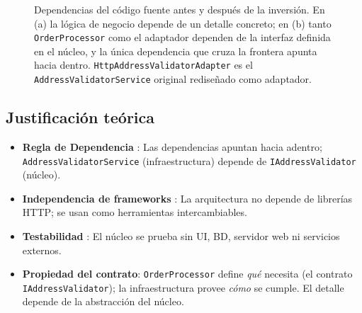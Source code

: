 \begin{figure}[H]
    \caption{Dependencias del código fuente antes y después de la inversión. En (a) la lógica de negocio depende de un detalle concreto; en (b) tanto \texttt{OrderProcessor} como el adaptador dependen de la interfaz definida en el núcleo, y la única dependencia que cruza la frontera apunta hacia dentro. \texttt{HttpAddressValidatorAdapter} es el \texttt{AddressValidatorService} original rediseñado como adaptador.}
    \label{fig:dip-before-after}
\end{figure}

\subsection*{Justificación teórica}

\begin{itemize}
    \item \textbf{Regla de Dependencia} : Las dependencias apuntan hacia adentro; \texttt{AddressValidatorService} (infraestructura) depende de \texttt{IAddressValidator} (núcleo).
    \item \textbf{Independencia de frameworks} : La arquitectura no depende de librerías HTTP; se usan como herramientas intercambiables.
    \item \textbf{Testabilidad} : El núcleo se prueba sin UI, BD, servidor web ni servicios externos.
    \item \textbf{Propiedad del contrato}: \texttt{OrderProcessor} define \textit{qué} necesita (el contrato \texttt{IAddressValidator}); la infraestructura provee \textit{cómo} se cumple. El detalle depende de la abstracción del núcleo.
\end{itemize}


